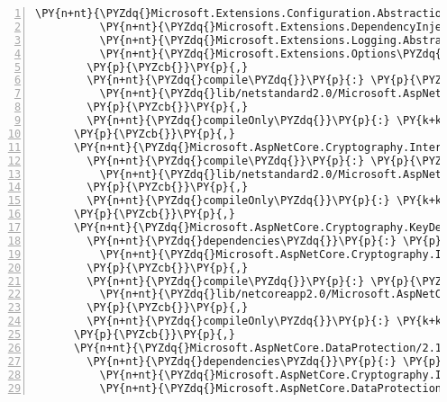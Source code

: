 \begin{Verbatim}[commandchars=\\\{\},numbers=left,firstnumber=1,stepnumber=1,numberblanklines=0]
          \PY{n+nt}{\PYZdq{}Microsoft.Extensions.Configuration.Abstractions\PYZdq{}}\PY{p}{:} \PY{l+s+s2}{\PYZdq{}2.1.0\PYZhy{}rc1\PYZhy{}final\PYZdq{}}\PY{p}{,}
          \PY{n+nt}{\PYZdq{}Microsoft.Extensions.DependencyInjection.Abstractions\PYZdq{}}\PY{p}{:} \PY{l+s+s2}{\PYZdq{}2.1.0\PYZhy{}rc1\PYZhy{}final\PYZdq{}}\PY{p}{,}
          \PY{n+nt}{\PYZdq{}Microsoft.Extensions.Logging.Abstractions\PYZdq{}}\PY{p}{:} \PY{l+s+s2}{\PYZdq{}2.1.0\PYZhy{}rc1\PYZhy{}final\PYZdq{}}\PY{p}{,}
          \PY{n+nt}{\PYZdq{}Microsoft.Extensions.Options\PYZdq{}}\PY{p}{:} \PY{l+s+s2}{\PYZdq{}2.1.0\PYZhy{}rc1\PYZhy{}final\PYZdq{}}
        \PY{p}{\PYZcb{}}\PY{p}{,}
        \PY{n+nt}{\PYZdq{}compile\PYZdq{}}\PY{p}{:} \PY{p}{\PYZob{}}
          \PY{n+nt}{\PYZdq{}lib/netstandard2.0/Microsoft.AspNetCore.Cors.dll\PYZdq{}}\PY{p}{:} \PY{p}{\PYZob{}}\PY{p}{\PYZcb{}}
        \PY{p}{\PYZcb{}}\PY{p}{,}
        \PY{n+nt}{\PYZdq{}compileOnly\PYZdq{}}\PY{p}{:} \PY{k+kc}{true}
      \PY{p}{\PYZcb{}}\PY{p}{,}
      \PY{n+nt}{\PYZdq{}Microsoft.AspNetCore.Cryptography.Internal/2.1.0\PYZhy{}rc1\PYZhy{}final\PYZdq{}}\PY{p}{:} \PY{p}{\PYZob{}}
        \PY{n+nt}{\PYZdq{}compile\PYZdq{}}\PY{p}{:} \PY{p}{\PYZob{}}
          \PY{n+nt}{\PYZdq{}lib/netstandard2.0/Microsoft.AspNetCore.Cryptography.Internal.dll\PYZdq{}}\PY{p}{:} \PY{p}{\PYZob{}}\PY{p}{\PYZcb{}}
        \PY{p}{\PYZcb{}}\PY{p}{,}
        \PY{n+nt}{\PYZdq{}compileOnly\PYZdq{}}\PY{p}{:} \PY{k+kc}{true}
      \PY{p}{\PYZcb{}}\PY{p}{,}
      \PY{n+nt}{\PYZdq{}Microsoft.AspNetCore.Cryptography.KeyDerivation/2.1.0\PYZhy{}rc1\PYZhy{}final\PYZdq{}}\PY{p}{:} \PY{p}{\PYZob{}}
        \PY{n+nt}{\PYZdq{}dependencies\PYZdq{}}\PY{p}{:} \PY{p}{\PYZob{}}
          \PY{n+nt}{\PYZdq{}Microsoft.AspNetCore.Cryptography.Internal\PYZdq{}}\PY{p}{:} \PY{l+s+s2}{\PYZdq{}2.1.0\PYZhy{}rc1\PYZhy{}final\PYZdq{}}
        \PY{p}{\PYZcb{}}\PY{p}{,}
        \PY{n+nt}{\PYZdq{}compile\PYZdq{}}\PY{p}{:} \PY{p}{\PYZob{}}
          \PY{n+nt}{\PYZdq{}lib/netcoreapp2.0/Microsoft.AspNetCore.Cryptography.KeyDerivation.dll\PYZdq{}}\PY{p}{:} \PY{p}{\PYZob{}}\PY{p}{\PYZcb{}}
        \PY{p}{\PYZcb{}}\PY{p}{,}
        \PY{n+nt}{\PYZdq{}compileOnly\PYZdq{}}\PY{p}{:} \PY{k+kc}{true}
      \PY{p}{\PYZcb{}}\PY{p}{,}
      \PY{n+nt}{\PYZdq{}Microsoft.AspNetCore.DataProtection/2.1.0\PYZhy{}rc1\PYZhy{}final\PYZdq{}}\PY{p}{:} \PY{p}{\PYZob{}}
        \PY{n+nt}{\PYZdq{}dependencies\PYZdq{}}\PY{p}{:} \PY{p}{\PYZob{}}
          \PY{n+nt}{\PYZdq{}Microsoft.AspNetCore.Cryptography.Internal\PYZdq{}}\PY{p}{:} \PY{l+s+s2}{\PYZdq{}2.1.0\PYZhy{}rc1\PYZhy{}final\PYZdq{}}\PY{p}{,}
          \PY{n+nt}{\PYZdq{}Microsoft.AspNetCore.DataProtection.Abstractions\PYZdq{}}\PY{p}{:} \PY{l+s+s2}{\PYZdq{}2.1.0\PYZhy{}rc1\PYZhy{}final\PYZdq{}}\PY{p}{,}

\end{Verbatim}
